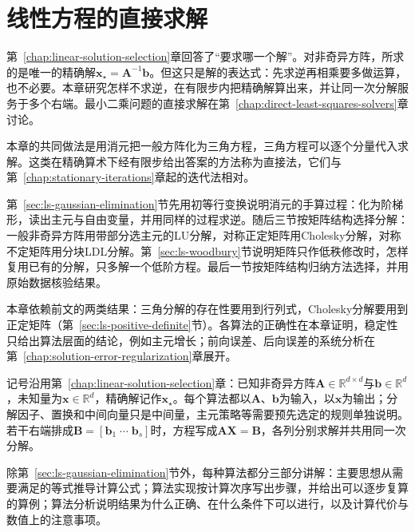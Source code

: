 \chapter{线性方程的直接求解}
\label{sec:ls-direct-methods}
\label{chap:direct-linear-solvers}

第~\ref{chap:linear-solution-selection}章回答了“要求哪一个解”。对非奇异方阵，所求的是唯一的精确解$\bm x_\star=\bm A^{-1}\bm b$。但这只是解的表达式：先求逆再相乘要多做运算，也不必要。本章研究怎样不求逆，在有限步内把精确解算出来，并让同一次分解服务于多个右端。最小二乘问题的直接求解在第~\ref{chap:direct-least-squares-solvers}章讨论。

本章的共同做法是用消元把一般方阵化为三角方程，三角方程可以逐个分量代入求解。这类在精确算术下经有限步给出答案的方法称为直接法，它们与第~\ref{chap:stationary-iterations}章起的迭代法相对。

第~\ref{sec:ls-gaussian-elimination}节先用初等行变换说明消元的手算过程：化为阶梯形，读出主元与自由变量，并用同样的过程求逆。随后三节按矩阵结构选择分解：一般非奇异方阵用带部分选主元的LU分解，对称正定矩阵用Cholesky分解，对称不定矩阵用分块LDL分解。第~\ref{sec:ls-woodbury}节说明矩阵只作低秩修改时，怎样复用已有的分解，只多解一个低阶方程。最后一节按矩阵结构归纳方法选择，并用原始数据核验结果。

本章依赖前文的两类结果：三角分解的存在性要用到行列式，Cholesky分解要用到正定矩阵（第~\ref{sec:ls-positive-definite}节）。各算法的正确性在本章证明，稳定性只给出算法层面的结论，例如主元增长；前向误差、后向误差的系统分析在第~\ref{chap:solution-error-regularization}章展开。

记号沿用第~\ref{chap:linear-solution-selection}章：已知非奇异方阵$\bm A\in\mathbb R^{d\times d}$与$\bm b\in\mathbb R^d$，未知量为$\bm x\in\mathbb R^d$，精确解记作$\bm x_\star$。每个算法都以$\bm A$、$\bm b$为输入，以$\bm x$为输出；分解因子、置换和中间向量只是中间量，主元策略等需要预先选定的规则单独说明。若干右端排成$\bm B=[\bm b_1\;\cdots\;\bm b_s]$时，方程写成$\bm A\bm X=\bm B$，各列分别求解并共用同一次分解。

除第~\ref{sec:ls-gaussian-elimination}节外，每种算法都分三部分讲解：主要思想从需要满足的等式推导计算公式；算法实现按计算次序写出步骤，并给出可以逐步复算的算例；算法分析说明结果为什么正确、在什么条件下可以进行，以及计算代价与数值上的注意事项。






